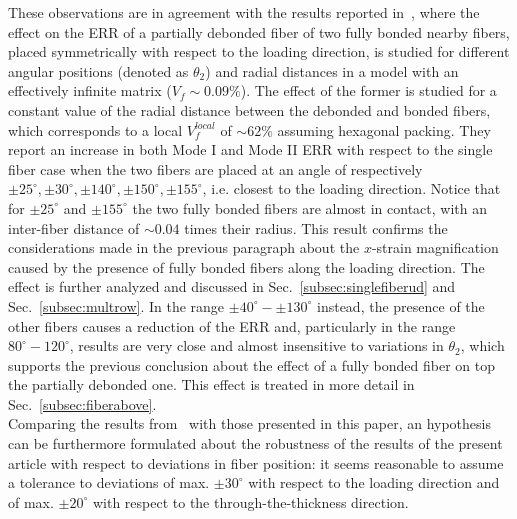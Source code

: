 \documentclass[review]{elsarticle}
\begin{document}
These observations are in agreement with the results reported in~\cite{Sandino2016}, where the effect on the ERR of a partially debonded fiber of two fully bonded nearby fibers, placed symmetrically with respect to the loading direction, is studied for different angular positions (denoted as $\theta_{2}$) and radial distances in a model with an effectively infinite matrix ($V_{f}\sim0.09\%$). The effect of the former is studied for a constant value of the radial distance between the debonded and bonded fibers, which corresponds to a local $V_{f}^{local}$ of $\sim62\%$ assuming hexagonal packing. They report an increase in both Mode I and Mode II ERR with respect to the single fiber case when the two fibers are placed at an angle of respectively $\pm25^{\circ},\pm30^{\circ},\pm140^{\circ},\pm150^{\circ},\pm155^{\circ}$, i.e. closest to the loading direction. Notice that for $\pm25^{\circ}$ and $\pm155^{\circ}$ the two fully bonded fibers are almost in contact, with an inter-fiber distance of $\sim0.04$ times their radius. This result confirms the considerations made in the previous paragraph about the $x$-strain magnification caused by the presence of fully bonded fibers along the loading direction. The effect is further analyzed and discussed in Sec.~\ref{subsec:singlefiberud} and Sec.~\ref{subsec:multrow}. In the range $\pm40^{\circ}-\pm130^{\circ}$ instead, the presence of the other fibers causes a reduction of the ERR and, particularly in the range $80^{\circ}-120^{\circ}$, results are very close and almost insensitive to variations in $\theta_{2}$, which supports the previous conclusion about the effect of a fully bonded fiber on top the partially debonded one. This effect is treated in more detail in Sec.~\ref{subsec:fiberabove}.\\
Comparing the results from~\cite{Sandino2016} with those presented in this paper, an hypothesis can be furthermore formulated about the robustness of the results of the present article with respect to deviations in fiber position: it seems reasonable to assume a tolerance to deviations of max. $\pm30^{\circ}$ with respect to the loading direction and of max. $\pm20^{\circ}$ with respect to the through-the-thickness direction.\\
\end{document}
